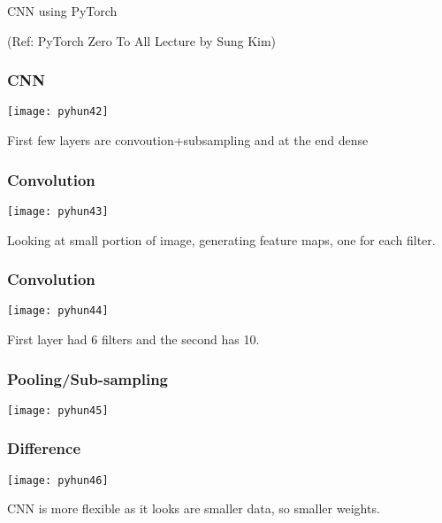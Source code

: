 \begin{frame}
  \begin{center}
    {\Large CNN using PyTorch}
    
  \end{center}
  
  \tiny{(Ref: PyTorch Zero To All Lecture by Sung Kim)}
\end{frame}


\begin{frame}[fragile] \frametitle{CNN}
\begin{center}
\texttt{[image: pyhun42]}
\end{center}
First few layers are convoution+subsampling and at the end dense
\end{frame}


\begin{frame}[fragile] \frametitle{Convolution}
\begin{center}
\texttt{[image: pyhun43]}
\end{center}
Looking at small portion of image, generating feature maps, one for each filter.
\end{frame}

\begin{frame}[fragile] \frametitle{Convolution}
\begin{center}
\texttt{[image: pyhun44]}
\end{center}
First layer had 6 filters and the second has 10.
\end{frame}


\begin{frame}[fragile] \frametitle{Pooling/Sub-sampling}
\begin{center}
\texttt{[image: pyhun45]}
\end{center}

\end{frame}


\begin{frame}[fragile] \frametitle{Difference}
\begin{center}
\texttt{[image: pyhun46]}
\end{center}
CNN is more flexible as it looks are smaller data, so smaller weights.
\end{frame}



